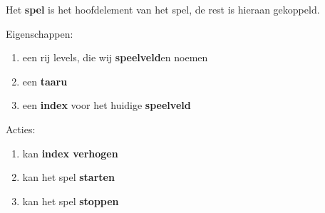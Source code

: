 Het \textbf{spel} is het hoofdelement van het spel, de rest is hieraan gekoppeld.

Eigenschappen:
\begin{enumerate}
  \item een rij levels, die wij \textbf{speelveld}en noemen
  \item een \textbf{taaru}
  \item een \textbf{index} voor het huidige \textbf{speelveld}

\end{enumerate}
Acties:
\begin{enumerate}
  \item kan \textbf{index verhogen}
  \item kan het spel \textbf{starten}
  \item kan het spel \textbf{stoppen}
\end{enumerate}
